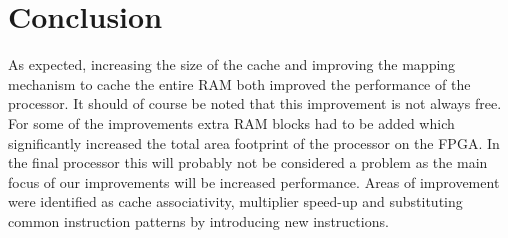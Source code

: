 \documentclass[final]{article}
\begin{document}
\section{Conclusion}
\label{sec:conclusion}
As expected, increasing the size of the cache and improving the mapping mechanism to cache the entire RAM both improved the performance of the processor. It should of course be noted that this improvement is not always free. For some of the improvements extra RAM blocks had to be added which significantly increased the total area footprint of the processor on the FPGA. In the final processor this will probably not be considered a problem as the main focus of our improvements will be increased performance. Areas of improvement were identified as cache associativity, multiplier speed-up and substituting common instruction patterns by introducing new instructions.
\end{document}
